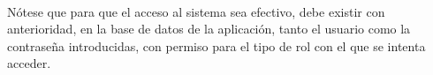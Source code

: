   \paragraph{}Nótese que para que el acceso al sistema sea efectivo, debe
  existir con anterioridad, en la base de datos de la aplicación, tanto el
  usuario como la contraseña introducidas, con permiso para el tipo de rol con
  el que se intenta acceder.

  